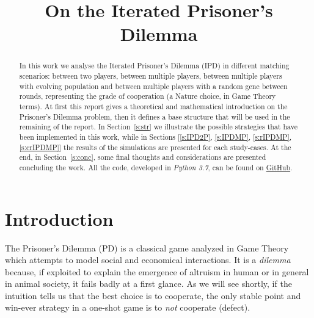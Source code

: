 \documentclass[journal,a4paper,10pt,twoside]{IEEEtran} %
\begin{document}
\title{On the Iterated Prisoner's Dilemma}

\author{%

}

\maketitle

\begin{abstract}
In this work we analyse the Iterated Prisoner's Dilemma (IPD) in different matching scenarios: between two players, between multiple players, between multiple players with evolving population and between multiple players with a random gene between rounds, representing the grade of cooperation (a Nature choice, in Game Theory terms).
At first this report gives a theoretical and mathematical introduction on the Prisoner's Dilemma problem, then it defines a base structure that will be used in the remaining of the report.
In Section~\ref{s:str} we illustrate the possible strategies that have been implemented in this work, while in Sections [\ref{s:IPD2P}, \ref{s:IPDMP}, \ref{s:rIPDMP}, \ref{s:crIPDMP}] the results of the simulations are presented for each study-cases.
At the end, in Section~\ref{s:conc}, some final thoughts and considerations are presented concluding the work.
All the code, developed in \textit{Python 3.7}, can be found on \href{https://github.com/eliabntt/LaboratoryOfComputationalPhysics/tree/Group9}{GitHub}.
\end{abstract}

\section{Introduction} \label{s:intro}
The Prisoner's Dilemma (PD) is a classical game analyzed in Game Theory which attempts to model social and economical interactions. It is a \textit{dilemma} because, if exploited to explain the emergence of altruism in human or in general in animal society, it fails badly at a first glance. As we will see shortly, if the intuition tells us that the best choice is to cooperate, the only stable point and win-ever strategy in a one-shot game is to \textit{not} cooperate (defect).
\end{document}
